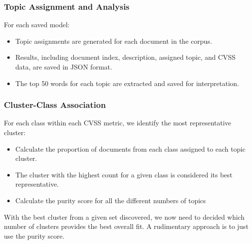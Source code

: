 \documentclass[12pt]{article}
\begin{document}




\subsubsection*{Topic Assignment and Analysis}

For each saved model:

\begin{itemize}

	\item Topic assignments are generated for each document in the corpus.

	\item Results, including document index, description, assigned topic, and CVSS data, are saved
	      in JSON format.

	\item The top 50 words for each topic are extracted and saved for interpretation.

\end{itemize}


\subsubsection*{Cluster-Class Association}

For each class within each CVSS metric, we identify the most representative cluster:

\begin{itemize}

	\item Calculate the proportion of documents from each class assigned to each topic cluster.

	\item The cluster with the highest count for a given class is considered its best representative.

	\item Calculate the purity score for all the different numbers of topics

\end{itemize}

With the best cluster from a given set discovered, we now need to decided which number of clusters
provides the best overall fit. A rudimentary approach is to just use the purity score.
\end{document}
